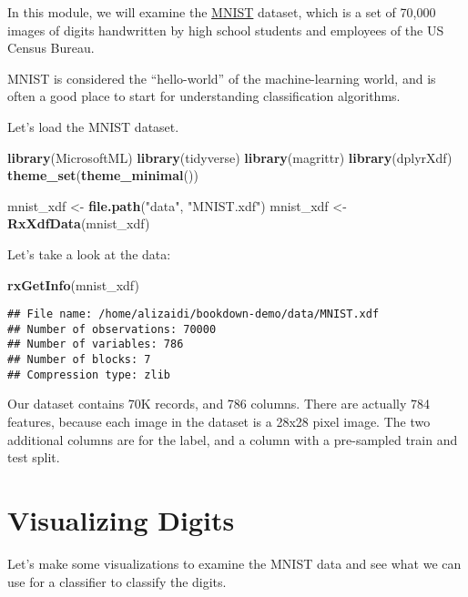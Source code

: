 \documentclass[]{book}
\newenvironment{Shaded}{\begin{snugshade}}{\end{snugshade}}
\newcommand{\KeywordTok}[1]{\textcolor[rgb]{0.13,0.29,0.53}{\textbf{#1}}}
\newcommand{\StringTok}[1]{\textcolor[rgb]{0.31,0.60,0.02}{#1}}
\newcommand{\NormalTok}[1]{#1}
\theoremstyle{definition}
\theoremstyle{definition}
\theoremstyle{definition}
\theoremstyle{remark}
\begin{document}
In this module, we will examine the
\href{http://yann.lecun.com/exdb/mnist/}{MNIST} dataset, which is a set
of 70,000 images of digits handwritten by high school students and
employees of the US Census Bureau.

MNIST is considered the ``hello-world'' of the machine-learning world,
and is often a good place to start for understanding classification
algorithms.

Let's load the MNIST dataset.

\begin{Shaded}
\begin{Highlighting}[]
\KeywordTok{library}\NormalTok{(MicrosoftML)}
\KeywordTok{library}\NormalTok{(tidyverse)}
\KeywordTok{library}\NormalTok{(magrittr)}
\KeywordTok{library}\NormalTok{(dplyrXdf)}
\KeywordTok{theme_set}\NormalTok{(}\KeywordTok{theme_minimal}\NormalTok{())}

\NormalTok{mnist_xdf <-}\StringTok{ }\KeywordTok{file.path}\NormalTok{(}\StringTok{"data"}\NormalTok{, }\StringTok{"MNIST.xdf"}\NormalTok{)}
\NormalTok{mnist_xdf <-}\StringTok{ }\KeywordTok{RxXdfData}\NormalTok{(mnist_xdf)}
\end{Highlighting}
\end{Shaded}

Let's take a look at the data:

\begin{Shaded}
\begin{Highlighting}[]
\KeywordTok{rxGetInfo}\NormalTok{(mnist_xdf)}
\end{Highlighting}
\end{Shaded}

\begin{verbatim}
## File name: /home/alizaidi/bookdown-demo/data/MNIST.xdf 
## Number of observations: 70000 
## Number of variables: 786 
## Number of blocks: 7 
## Compression type: zlib
\end{verbatim}

Our dataset contains 70K records, and 786 columns. There are actually
784 features, because each image in the dataset is a 28x28 pixel image.
The two additional columns are for the label, and a column with a
pre-sampled train and test split.

\section{Visualizing Digits}\label{visualizing-digits}

Let's make some visualizations to examine the MNIST data and see what we
can use for a classifier to classify the digits.
\end{document}
